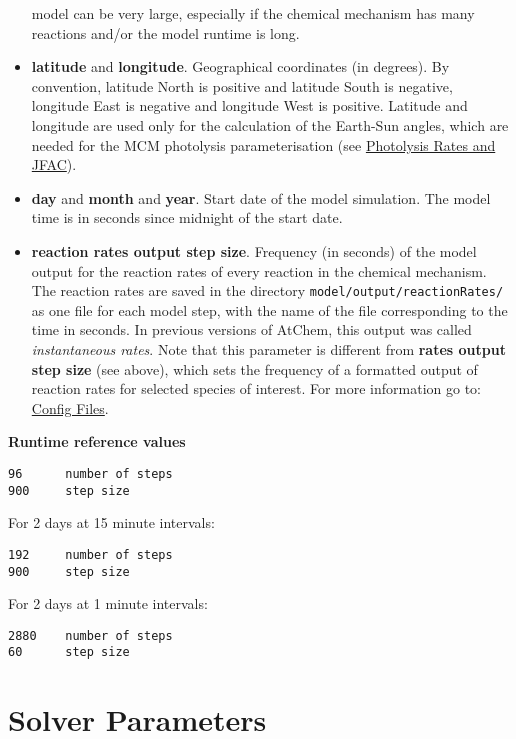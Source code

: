 \begin{itemize}
  model can be very large, especially if the chemical mechanism has
  many reactions and/or the model runtime is long.
\item \textbf{latitude} and \textbf{longitude}. Geographical
  coordinates (in degrees). By convention, latitude North is positive
  and latitude South is negative, longitude East is negative and
  longitude West is positive. Latitude and longitude are used only for
  the calculation of the Earth-Sun angles, which are needed for the
  MCM photolysis parameterisation (see
  \hyperref[sec:photolysis-rates]{Photolysis Rates and JFAC}).
\item \textbf{day} and \textbf{month} and \textbf{year}. Start date of
  the model simulation. The model time is in seconds since midnight of
  the start date.
\item \textbf{reaction rates output step size}. Frequency (in seconds)
  of the model output for the reaction rates of every reaction in the
  chemical mechanism. The reaction rates are saved in the directory
  \texttt{model/output/reactionRates/} as one file for each model
  step, with the name of the file corresponding to the time in
  seconds. In previous versions of AtChem, this output was called
  \emph{instantaneous rates}. Note that this parameter is different
  from \textbf{rates output step size} (see above), which sets the
  frequency of a formatted output of reaction rates for selected
  species of interest. For more information go to:
  \hyperref[sec:config-files]{Config Files}.
\end{itemize}

\textbf{Runtime reference values}

\begin{verbatim}
96      number of steps
900     step size
\end{verbatim}

For 2 days at 15 minute intervals:

\begin{verbatim}
192     number of steps
900     step size
\end{verbatim}

For 2 days at 1 minute intervals:

\begin{verbatim}
2880    number of steps
60      step size
\end{verbatim}

\section{Solver Parameters} \label{sec:solver-parameters}

